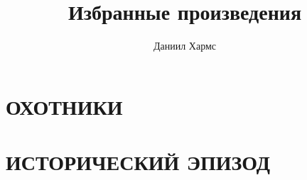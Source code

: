 \documentclass{article}
\begin{document}
\title{Избранные произведения}
\author{Даниил Хармс}
\maketitle

\section{ОХОТНИКИ}


\section{ИСТОРИЧЕСКИЙ ЭПИЗОД}

\end{document}

